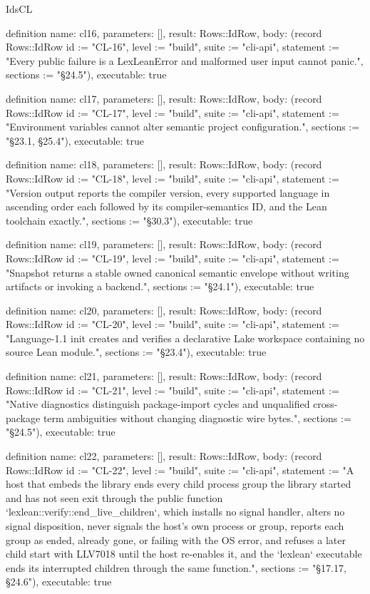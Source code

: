 \begin{lexlean}{IdsCL}
\begin{semanticmodule}
definition{
  name: cl16,
  parameters: [],
  result: Rows::IdRow,
  body: (record Rows::IdRow {id := "CL-16", level := "build", suite := "cli-api", statement := "Every public failure is a LexLeanError and malformed user input cannot panic.", sections := "§24.5"}),
  executable: true
}

definition{
  name: cl17,
  parameters: [],
  result: Rows::IdRow,
  body: (record Rows::IdRow {id := "CL-17", level := "build", suite := "cli-api", statement := "Environment variables cannot alter semantic project configuration.", sections := "§23.1, §25.4"}),
  executable: true
}

definition{
  name: cl18,
  parameters: [],
  result: Rows::IdRow,
  body: (record Rows::IdRow {id := "CL-18", level := "build", suite := "cli-api", statement := "Version output reports the compiler version, every supported language in ascending order each followed by its compiler-semantics ID, and the Lean toolchain exactly.", sections := "§30.3"}),
  executable: true
}

definition{
  name: cl19,
  parameters: [],
  result: Rows::IdRow,
  body: (record Rows::IdRow {id := "CL-19", level := "build", suite := "cli-api", statement := "Snapshot returns a stable owned canonical semantic envelope without writing artifacts or invoking a backend.", sections := "§24.1"}),
  executable: true
}

definition{
  name: cl20,
  parameters: [],
  result: Rows::IdRow,
  body: (record Rows::IdRow {id := "CL-20", level := "build", suite := "cli-api", statement := "Language-1.1 init creates and verifies a declarative Lake workspace containing no source Lean module.", sections := "§23.4"}),
  executable: true
}

definition{
  name: cl21,
  parameters: [],
  result: Rows::IdRow,
  body: (record Rows::IdRow {id := "CL-21", level := "build", suite := "cli-api", statement := "Native diagnostics distinguish package-import cycles and unqualified cross-package term ambiguities without changing diagnostic wire bytes.", sections := "§24.5"}),
  executable: true
}

definition{
  name: cl22,
  parameters: [],
  result: Rows::IdRow,
  body: (record Rows::IdRow {id := "CL-22", level := "build", suite := "cli-api", statement := "A host that embeds the library ends every child process group the library started and has not seen exit through the public function `lexlean::verify::end_live_children`, which installs no signal handler, alters no signal disposition, never signals the host's own process or group, reports each group as ended, already gone, or failing with the OS error, and refuses a later child start with LLV7018 until the host re-enables it, and the `lexlean` executable ends its interrupted children through the same function.", sections := "§17.17, §24.6"}),
  executable: true
}


\end{semanticmodule}
\end{lexlean}
